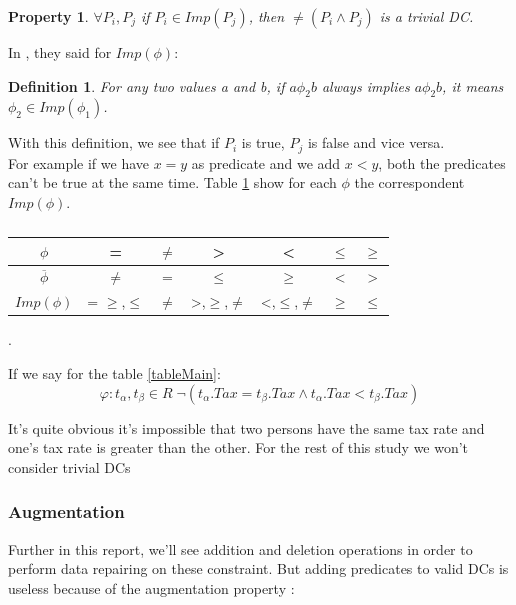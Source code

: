 \documentclass[letterpaper, 12pt]{report}
\newtheorem{mydef}{Definition}
\newtheorem{myprop}{Property}
\begin{document}
\begin{myprop}
 $\forall P_i, P_j$ if $P_i \in Imp(P_j)$, then $\neq(P_i \wedge P_j)$ is a trivial DC.
\end{myprop}

In \cite{main}, they said for $Imp(\phi)$:

\begin{mydef} For any two values a and b, if $a \phi_2 b$ always implies $a \phi_2 b$, it means $\phi_2 \in Imp(\phi_1)$.
\end{mydef}

With this definition, we see that if $P_i$ is true, $P_j$ is false and vice versa.\\

For example if we have $x = y$ as predicate and we add $x < y$, both the predicates can't be true at the same time. Table \ref{tableImp} show for each $\phi$ the correspondent $Imp(\phi)$.

\begin{table}[H]
	\centering
	\begin{tabular}{|c|c|c|c|c|c|c|}
	\hline
	   $ \phi$ & = & $\neq$ & > & < & $\leq$& $\geq$\\
	   \hline
	   $ \overline{\phi}$ & $\neq$ & = & $\leq$ & $\geq$ & < & >\\
	   \hline
	   $Imp(\phi)$ & = $\geq$,$\leq$ & $\neq$ & >,$\geq$,$\neq$ & <,$\leq$,$\neq$ & $\geq$ & $\leq$ \\
	\hline
	 
	 \hline
	\end{tabular}
	\caption{\label{tableImp}}.
\end{table}

If we say for the table \ref{tableMain}:
$$\varphi : t_\alpha,t_\beta \in R \; \neg(t_\alpha.Tax = t_\beta.Tax \wedge t_\alpha.Tax < t_\beta.Tax)$$

It's quite obvious it's impossible that two persons have the same tax rate and one's tax rate is greater than the other. For the rest of this study we won't consider trivial DCs

\subsubsection{Augmentation}

Further in this report, we'll see addition and deletion operations in order to perform data repairing on these constraint. But adding predicates to valid DCs is useless because of the augmentation property \cite{DCs}:
\end{document}
